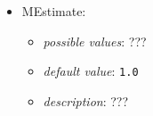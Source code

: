 \documentclass{article}
\begin{document}
\begin{itemize}
    \item MEstimate:
           \begin{itemize}
                \item \emph{possible values}: ???
                \item \emph{default value}: \texttt{1.0}
                \item \emph{description}: ???
           \end{itemize}
\end{itemize}
\end{document}
